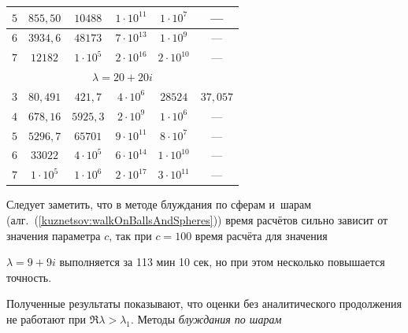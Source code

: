 \begin{table}
\begin{minipage}[t]{.5\textwidth}
\begin{tabular}{c|c|c|c|c|c}
      $5$&$855{,}50$&$10488$&$1\cdot10^{11}$&$1\cdot10^7$&---\\

      \hline

      $6$&$3934{,}6$&$48173$&$7\cdot10^{13}$&$1\cdot10^9$&---\\

      \hline

      $7$&$12182$&$1\cdot10^5$&$2\cdot10^{16}$&$2\cdot10^{10}$&---\\

      \hline

      \multicolumn{6}{c}{$\lambda=20+20i$}\\

      \hline

      $3$&$80{,}491$&$421{,}7$&$4\cdot10^6$&$28524$&$37{,}057$\\

      \hline

      $4$&$678{,}16$&$5925{,}3$&$2\cdot10^9$&$1\cdot10^6$&---\\

      \hline

      $5$&$5296{,}7$&$65701$&$9\cdot10^{11}$&$8\cdot10^7$&---\\

      \hline

      $6$&$33022$&$4\cdot10^5$&$6\cdot10^{14}$&$1\cdot10^{10}$&---\\

      \hline

      $7$&$1\cdot10^5$&$1\cdot10^6$&$2\cdot10^{17}$&$3\cdot10^{11}$&---\\

      \hline

    \end{tabular}

    \end{minipage}

\end{table}



\noindent  Следует заметить,  что в методе блуждания по сферам и~шарам (алг.~(\ref{kuznetsov:walkOnBallsAndSpheres})) время расчётов сильно зависит от значения параметра $c$,  так при $c=100$ время расчёта для значения

$\lambda=9+9i$ выполняется за 113 мин 10 сек,  но при этом несколько повышается точность.



Полученные результаты показывают,  что оценки без аналитического продолжения не работают при $\Re\lambda>\lambda_1$. Методы \emph{блуждания по шарам}

